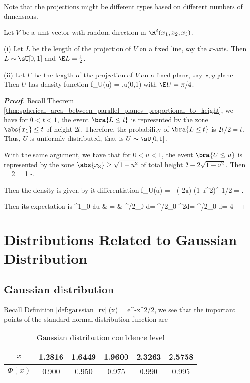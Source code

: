 Note that the projections might be different types based on different numbers of dimensions.

\begin{proposition}
Let $V$ be a unit vector with random direction in $\R^3(x_1,x_2,x_3)$. 
\ben
\item [(i)] Let $L$ be the length of the projection of $V$ on a fixed line, say the $x$-axis. Then $L\sim \sU[0,1]$ and $\E L = \frac 12$.
\item [(ii)] Let $U$ be the length of the projection of $V$ on a fixed plane, say $x,y$-plane. Then $U$ has density function
\be
f_U(u) = ,\qquad u\in (0,1)
\ee
with $\E U =\pi/4$.
\een
\end{proposition}

\begin{proof}[\bf Proof]
Recall Theorem \ref{thm:spherical_area_between_parallel_planes_proportional_to_height}, we have for $0<t<1$, the event $\bra{L\leq t}$ is represented by the zone $\abs{x_1}\leq t$ of height $2t$. Therefore, the probability of $\bra{L\leq t}$ is $2t/2 = t$. Thus, $U$ is uniformly distributed, that is $U \sim \sU[0,1]$.

With the same argument, we have that for $0<u<1$, the event $\bra{U\leq u}$ is represented by the zone $\abs{x_3} \geq \sqrt{1-u^2}$ of total height $2-2\sqrt{1-u^2}$. Then 
\be
\pro{} = 2 = 1 -.
\ee 

Then the density is given by it differentiation
\be
f_U(u) = -  \cdot (-2u) (1-u^2)^{-1/2} =  .
\ee

Then its expectation is
\beast
\int^1_0 du & = & \int^{\pi/2}_0 \frac{\sin^2\theta}{\cos \theta} d\sin\theta = \int^{\pi/2}_0 \sin^2\theta d\theta = \int^{\pi/2}_0  d\theta = \frac {\pi}4.
\eeast
\end{proof}

\section{Distributions Related to Gaussian Distribution}

\subsection{Gaussian distribution}

Recall Definition \ref{def:gaussian_rv} 
\be
\phi(x) = e^{-x^2/2},
\ee
we see that the important points of the standard normal distribution function are
\begin{table}[hp]\label{tab:guassian_distribution_confidence_level}
\caption{Gaussian distribution confidence level}
\begin{center}
\begin{tabular}{cccccc}
$x$ & 1.2816 & 1.6449 & 1.9600 & 2.3263 & 2.5758 \\
\hline
$\Phi(x)$ & 0.900 & 0.950 & 0.975 & 0.990 & 0.995\\
\end{tabular}
\end{center}
\end{table}

